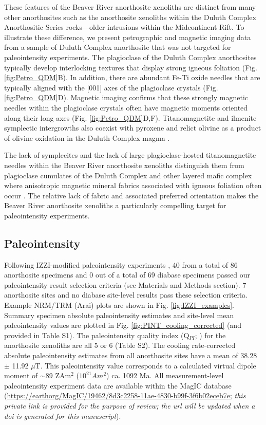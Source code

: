 \documentclass[9pt,twocolumn,twoside,lineno]{pnas-new}
\begin{document}
These features of the Beaver River anorthosite xenoliths are distinct from many other anorthosites such as the anorthosite xenoliths within the Duluth Complex Anorthositic Series rocks---older intrusions within the Midcontinent Rift. To illustrate these difference, we present petrographic and magnetic imaging data from a sample of Duluth Complex anorthosite that was not targeted for paleointensity experiments. The plagioclase of the Duluth Complex anorthosites typically develop interlocking textures that display strong igneous foliation (Fig. \ref{fig:Petro_QDM}B). In addition, there are abundant Fe-Ti oxide needles that are typically aligned with the [001] axes of the plagioclase crystals (Fig. \ref{fig:Petro_QDM}D). Magnetic imaging confirms that these strongly magnetic needles within the plagioclase crystals often have magnetic moments oriented along their long axes (Fig. \ref{fig:Petro_QDM}D,F). Titanomagnetite and ilmenite symplectic intergrowths also coexist with pyroxene and relict olivine as a product of olivine oxidation in the Duluth Complex magma \cite{Miller1990a}.

The lack of symplecites and the lack of large plagioclase-hosted titanomagnetite needles within the Beaver River anorthosite xenoliths distinguish them from plagioclase cumulates of the Duluth Complex and other layered mafic complex where anisotropic magnetic mineral fabrics associated with igneous foliation often occur \cite{Scofield1986a, Selkin2000a, Feinberg2006a}. The relative lack of fabric and associated preferred orientation makes the Beaver River anorthosite xenoliths a particularly compelling target for paleointensity experiments.

\subsection*{Paleointensity}

Following IZZI-modified paleointensity experiments \cite{Yu2004a}, 40 from a total of 86 anorthosite specimens and 0 out of a total of 69 diabase specimens passed our paleointensity result selection criteria (see Materials and Methods section). 7 anorthosite sites and no diabase site-level results pass these selection criteria. Example NRM/TRM (Arai) plots are shown in Fig. \ref{fig:IZZI_examples}. Summary specimen absolute paleointensity estimates and site-level mean paleointensity values are plotted in Fig. \ref{fig:PINT_cooling_corrected} (and provided in Table S1). The paleointensity quality index (Q$_{PI}$;  \citealp{Biggin2014a}) for the anorthosite xenoliths are all 5 or 6 (Table S2). The cooling rate-corrected absolute paleointensity estimates from all anorthosite sites have a mean of 38.28 $\pm$ 11.92 $\mu$T. This paleointensity value corresponds to a calculated virtual dipole moment of $\sim$89 ZAm$^2$ ($10^{21} Am^2$) ca. 1092 Ma. All measurement-level paleointensity experiment data are available within the MagIC database (\url{https://earthorg/MagIC/19462/8d3c2258-11ae-4830-b99f-3f6b02eceb7e}; \textit{this private link is provided for the purpose of review; the url will be updated when a doi is generated for this manuscript}). 
\end{document}
